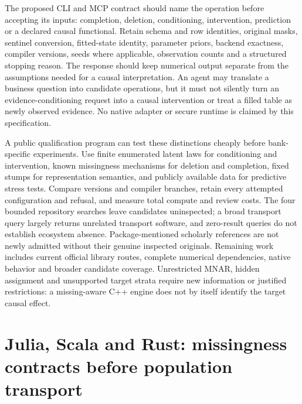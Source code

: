 The proposed CLI and MCP contract should name the operation before accepting its inputs: completion, deletion, conditioning, intervention, prediction or a declared causal functional. Retain schema and row identities, original masks, sentinel conversion, fitted-state identity, parameter priors, backend exactness, compiler versions, seeds where applicable, observation counts and a structured stopping reason. The response should keep numerical output separate from the assumptions needed for a causal interpretation. An agent may translate a business question into candidate operations, but it must not silently turn an evidence-conditioning request into a causal intervention or treat a filled table as newly observed evidence. No native adapter or secure runtime is claimed by this specification.~\citep{exec25_ctm_choice}

A public qualification program can test these distinctions cheaply before bank-specific experiments. Use finite enumerated latent laws for conditioning and intervention, known missingness mechanisms for deletion and completion, fixed stumps for representation semantics, and publicly available data for predictive stress tests. Compare versions and compiler branches, retain every attempted configuration and refusal, and measure total compute and review costs. The four bounded repository searches leave candidates uninspected; a broad transport query largely returns unrelated transport software, and zero-result queries do not establish ecosystem absence. Package-mentioned scholarly references are not newly admitted without their genuine inspected originals. Remaining work includes current official library routes, complete numerical dependencies, native behavior and broader candidate coverage. Unrestricted MNAR, hidden assignment and unsupported target strata require new information or justified restrictions: a missing-aware C++ engine does not by itself identify the target causal effect.~\citep{exec25_ctm_choice}


\section[Remaining-language transport and missingness contracts]{Julia, Scala and Rust: missingness contracts before population transport}
\label{sec:exec25-otm}

